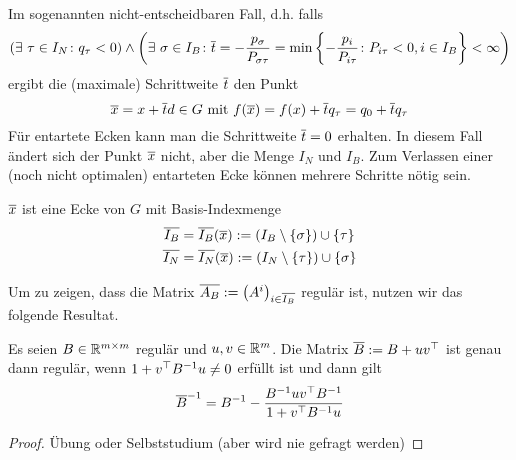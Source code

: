 Im sogenannten nicht-entscheidbaren Fall, d.h. falls
\begin{equation*}
	\left( \exists \ \tau \in I_N \colon q_\tau < 0 \right) \land \left(  \exists \ \sigma \in I_B \colon \overline{t} = -\frac{p_\sigma}{P_{\sigma \tau}} = \min \left\{ -\frac{p_i}{P_{i \tau}} \colon P_{i \tau} < 0, i \in I_B \right\} < \infty \right)
\end{equation*}
ergibt die (maximale) Schrittweite $\overline{t}$ den Punkt
\begin{equation*}
	\overline{x} = x + \overline{t} d \in G \text{ mit } f(\overline{x}) = f(x) + \overline{t} q_\tau = q_0 + \overline{t} q_\tau
\end{equation*}
Für entartete Ecken kann man die Schrittweite $\overline{t} = 0$ erhalten. In diesem Fall ändert sich der Punkt $\overline{x}$ nicht, aber die Menge $I_N$ und $I_B$. Zum Verlassen einer (noch nicht optimalen) entarteten Ecke können mehrere Schritte nötig sein. 

\begin{satz} %
	\label{satz: 3.6}
	$\overline{x}$ ist eine Ecke von $G$ mit Basis-Indexmenge
	\begin{equation*}
		\begin{aligned}
			\overline{I_B} &= \overline{I_B}(\overline{x}) \mathrel{:=} \left( I_B \setminus \left\{ \sigma \right\} \right) \cup \left\{ \tau \right\} \\
			\overline{I_N} &= \overline{I_N}(\overline{x}) \mathrel{:=} \left( I_N \setminus \left\{ \tau \right\} \right) \cup \left\{ \sigma \right\}
		\end{aligned}
	\end{equation*}
\end{satz}

Um zu zeigen, dass die Matrix $\overline{A_B} \mathrel{:=} \left( A^i \right)_{i \in \overline{I_B}}$ regulär ist, nutzen wir das folgende Resultat.

\begin{lemma} %
	\label{lemma: 3.7}
	Es seien $B \in \mathbb{R}^{m \times m}$ regulär und $u,v \in \mathbb{R}^m$. Die Matrix $\overline{B} \mathrel{:=} B + u v^{\top}$ ist genau dann regulär, wenn $1 + v^{\top} B^{-1} u \neq 0$ erfüllt ist und dann gilt
	\begin{equation*}
		\overline{B}^{-1} = B^{-1} - \frac{B^{-1} u v^{\top} B^{-1}}{1 + v^{\top} B^{-1} u}
	\end{equation*}
\end{lemma}
\begin{proof}
	Übung oder Selbststudium (aber wird nie gefragt werden)
\end{proof}


